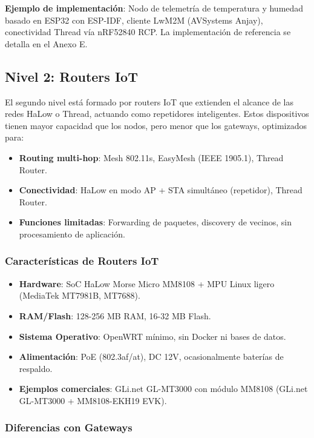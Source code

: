\textbf{Ejemplo de implementación}: Nodo de telemetría de temperatura y humedad basado en ESP32 con ESP-IDF, cliente LwM2M (AVSystems Anjay), conectividad Thread vía nRF52840 RCP. La implementación de referencia se detalla en el Anexo E.

\subsection{Nivel 2: Routers IoT}

El segundo nivel está formado por routers IoT que extienden el alcance de las redes HaLow o Thread, actuando como repetidores inteligentes. Estos dispositivos tienen mayor capacidad que los nodos, pero menor que los gateways, optimizados para:

\begin{itemize}
    \item \textbf{Routing multi-hop}: Mesh 802.11s, EasyMesh (IEEE 1905.1), Thread Router.
    \item \textbf{Conectividad}: HaLow en modo AP + STA simultáneo (repetidor), Thread Router.
    \item \textbf{Funciones limitadas}: Forwarding de paquetes, discovery de vecinos, sin procesamiento de aplicación.
\end{itemize}

\subsubsection{Características de Routers IoT}

\begin{itemize}
    \item \textbf{Hardware}: SoC HaLow Morse Micro MM8108 + MPU Linux ligero (MediaTek MT7981B, MT7688).
    \item \textbf{RAM/Flash}: 128-256 MB RAM, 16-32 MB Flash.
    \item \textbf{Sistema Operativo}: OpenWRT mínimo, sin Docker ni bases de datos.
    \item \textbf{Alimentación}: PoE (802.3af/at), DC 12V, ocasionalmente baterías de respaldo.
    \item \textbf{Ejemplos comerciales}: GLi.net GL-MT3000 con módulo MM8108 (GLi.net GL-MT3000 + MM8108-EKH19 EVK)\cite{morse_micro_mm8108_2025}.
\end{itemize}

\subsubsection{Diferencias con Gateways}

